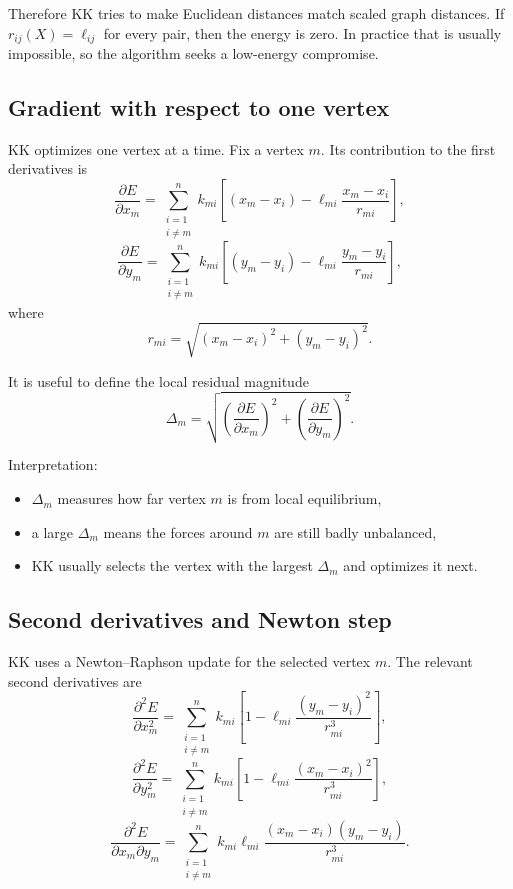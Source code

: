 \documentclass[11pt]{article}
\begin{document}
Therefore KK tries to make Euclidean distances match scaled graph distances.
If $r_{ij}(X) = \ell_{ij}$ for every pair, then the energy is zero. In practice
that is usually impossible, so the algorithm seeks a low-energy compromise.

\subsection{Gradient with respect to one vertex}

KK optimizes one vertex at a time. Fix a vertex $m$. Its contribution to the
first derivatives is
\[
\frac{\partial E}{\partial x_m}
= \sum_{\substack{i=1 \\ i \ne m}}^n
k_{mi}
\left[
(x_m - x_i)
- \ell_{mi}\frac{x_m - x_i}{r_{mi}}
\right],
\]
\[
\frac{\partial E}{\partial y_m}
= \sum_{\substack{i=1 \\ i \ne m}}^n
k_{mi}
\left[
(y_m - y_i)
- \ell_{mi}\frac{y_m - y_i}{r_{mi}}
\right],
\]
where
\[
r_{mi} = \sqrt{(x_m - x_i)^2 + (y_m - y_i)^2}.
\]

It is useful to define the local residual magnitude
\[
\Delta_m
=
\sqrt{
\left(\frac{\partial E}{\partial x_m}\right)^2
+
\left(\frac{\partial E}{\partial y_m}\right)^2
}.
\]

Interpretation:
\begin{itemize}[leftmargin=1.5em]
\item $\Delta_m$ measures how far vertex $m$ is from local equilibrium,
\item a large $\Delta_m$ means the forces around $m$ are still badly unbalanced,
\item KK usually selects the vertex with the largest $\Delta_m$ and optimizes it next.
\end{itemize}

\subsection{Second derivatives and Newton step}

KK uses a Newton--Raphson update for the selected vertex $m$. The relevant
second derivatives are
\[
\frac{\partial^2 E}{\partial x_m^2}
= \sum_{\substack{i=1 \\ i \ne m}}^n
k_{mi}
\left[
1 - \ell_{mi}\frac{(y_m - y_i)^2}{r_{mi}^3}
\right],
\]
\[
\frac{\partial^2 E}{\partial y_m^2}
= \sum_{\substack{i=1 \\ i \ne m}}^n
k_{mi}
\left[
1 - \ell_{mi}\frac{(x_m - x_i)^2}{r_{mi}^3}
\right],
\]
\[
\frac{\partial^2 E}{\partial x_m \partial y_m}
= \sum_{\substack{i=1 \\ i \ne m}}^n
k_{mi}
\ell_{mi}
\frac{(x_m - x_i)(y_m - y_i)}{r_{mi}^3}.
\]
\end{document}

